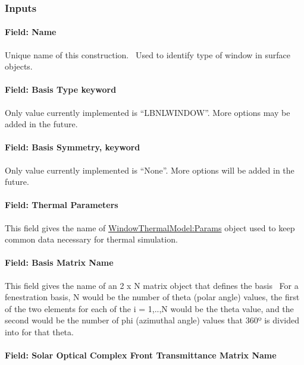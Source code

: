 \subsubsection{Inputs}\label{inputs-39}

\paragraph{Field: Name}\label{field-name-32-000}

Unique name of this construction.~ Used to identify type of window in surface objects.

\paragraph{Field: Basis Type keyword}\label{field-basis-type-keyword}

Only value currently implemented is ``LBNLWINDOW''. More options may be added in the future.

\paragraph{Field: Basis Symmetry, keyword}\label{field-basis-symmetry-keyword}

Only value currently implemented is ``None''. More options will be added in the future.

\paragraph{Field: Thermal Parameters}\label{field-thermal-parameters}

This field gives the name of \hyperref[windowthermalmodelparams]{WindowThermalModel:Params} object used to keep common data necessary for thermal simulation.

\paragraph{Field: Basis Matrix Name}\label{field-basis-matrix-name}

This field gives the name of an 2 x N matrix object that defines the basis~ For a fenestration basis, N would be the number of theta (polar angle) values, the first of the two elements for each of the i = 1,..,N would be the theta value, and the second would be the number of phi (azimuthal angle) values that 360º is divided into for that theta.

\paragraph{Field: Solar Optical Complex Front Transmittance Matrix Name}\label{field-solar-optical-complex-front-transmittance-matrix-name}

